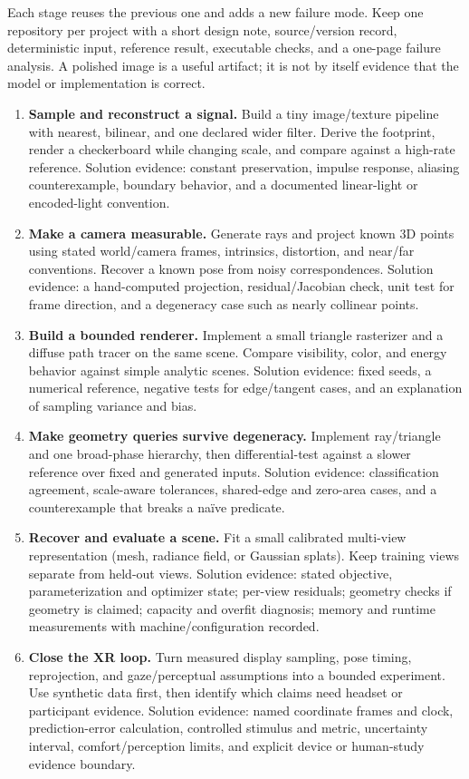 Each stage reuses the previous one and adds a new failure mode. Keep one repository per project with a short design note, source/version record, deterministic input, reference result, executable checks, and a one-page failure analysis. A polished image is a useful artifact; it is not by itself evidence that the model or implementation is correct.

\begin{enumerate}
\def\labelenumi{\arabic{enumi}.}
\tightlist
\item
  \textbf{Sample and reconstruct a signal.} Build a tiny image/texture pipeline with nearest, bilinear, and one declared wider filter. Derive the footprint, render a checkerboard while changing scale, and compare against a high-rate reference. Solution evidence: constant preservation, impulse response, aliasing counterexample, boundary behavior, and a documented linear-light or encoded-light convention.
\item
  \textbf{Make a camera measurable.} Generate rays and project known 3D points using stated world/camera frames, intrinsics, distortion, and near/far conventions. Recover a known pose from noisy correspondences. Solution evidence: a hand-computed projection, residual/Jacobian check, unit test for frame direction, and a degeneracy case such as nearly collinear points.
\item
  \textbf{Build a bounded renderer.} Implement a small triangle rasterizer and a diffuse path tracer on the same scene. Compare visibility, color, and energy behavior against simple analytic scenes. Solution evidence: fixed seeds, a numerical reference, negative tests for edge/tangent cases, and an explanation of sampling variance and bias.
\item
  \textbf{Make geometry queries survive degeneracy.} Implement ray/triangle and one broad-phase hierarchy, then differential-test against a slower reference over fixed and generated inputs. Solution evidence: classification agreement, scale-aware tolerances, shared-edge and zero-area cases, and a counterexample that breaks a naïve predicate.
\item
  \textbf{Recover and evaluate a scene.} Fit a small calibrated multi-view representation (mesh, radiance field, or Gaussian splats). Keep training views separate from held-out views. Solution evidence: stated objective, parameterization and optimizer state; per-view residuals; geometry checks if geometry is claimed; capacity and overfit diagnosis; memory and runtime measurements with machine/configuration recorded.
\item
  \textbf{Close the XR loop.} Turn measured display sampling, pose timing, reprojection, and gaze/perceptual assumptions into a bounded experiment. Use synthetic data first, then identify which claims need headset or participant evidence. Solution evidence: named coordinate frames and clock, prediction-error calculation, controlled stimulus and metric, uncertainty interval, comfort/perception limits, and explicit device or human-study evidence boundary.
\end{enumerate}

